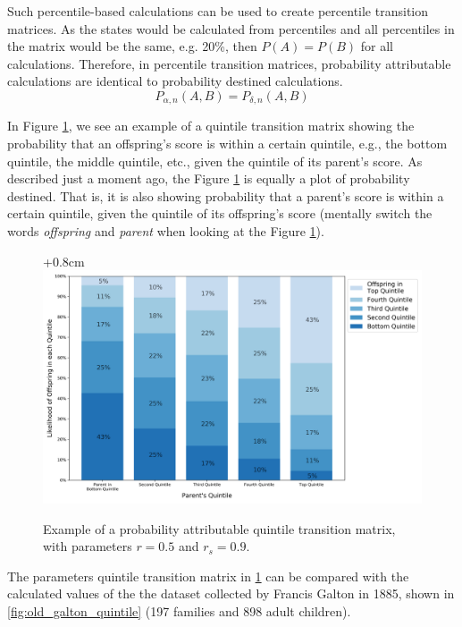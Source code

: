 \documentclass[letterpaper,10pt]{article} %
\begin{document}
Such percentile-based calculations can be used to create percentile transition matrices. As the states would be calculated from percentiles and all percentiles in the matrix would be the same, e.g. 20\%, then $P(A) = P(B)$ for all calculations. Therefore, in percentile transition matrices, probability attributable calculations are identical to probability destined calculations.
$$P_{\alpha , n}(A, B) = P_{\delta , n}(A, B)$$

In Figure \ref{fig:old_quintile_p1}, we see an example of a quintile transition matrix showing the probability that an offspring's score is within a certain quintile, e.g., the bottom quintile, the middle quintile, etc., given the quintile of its parent's score. As described just a moment ago, the Figure \ref{fig:old_quintile_p1} is equally a plot of probability destined. That is, it is also showing probability that a parent's score is within a certain quintile, given the quintile of its offspring's score (mentally switch the words \emph{offspring} and \emph{parent} when looking at the Figure \ref{fig:old_quintile_p1}).

\begin{figure}[h]
\centering
\advance\leftskip+0.8cm
\includegraphics[width=0.8\linewidth]{figures/model_mobility_n1000_r50_r_s90_.png} 
\caption{Example of a probability attributable quintile transition matrix, with parameters $r = 0.5$ and $r_s = 0.9$.}
\label{fig:old_quintile_p1}
\end{figure}

The parameters quintile transition matrix in \ref{fig:old_quintile_p1} can be compared with the calculated values of the the dataset collected by Francis Galton in 1885, shown in  \ref{fig:old_galton_quintile} (197 families and 898 adult children). 
\end{document}
